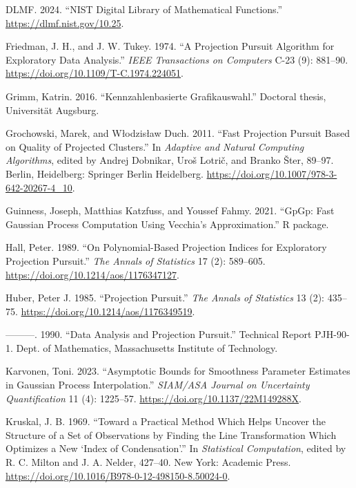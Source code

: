 \documentclass[
  12pt,
]{interact}
\newlength{\cslhangindent}
\newenvironment{CSLReferences}[2] %
 {\begin{list}{}{%
  \setlength{\itemindent}{0pt}
  \setlength{\leftmargin}{0pt}
  \setlength{\parsep}{0pt}
  \ifodd #1
   \setlength{\leftmargin}{\cslhangindent}
   \setlength{\itemindent}{-1\cslhangindent}
  \fi
  \setlength{\itemsep}{#2\baselineskip}}}
 {\end{list}}
\theoremstyle{plain}
\begin{document}
\begin{CSLReferences}{1}{0}
DLMF. 2024. {``{NIST Digital Library of Mathematical Functions}.''}
\url{https://dlmf.nist.gov/10.25}.

Friedman, J. H., and J. W. Tukey. 1974. {``A Projection Pursuit
Algorithm for Exploratory Data Analysis.''} \emph{IEEE Transactions on
Computers} C-23 (9): 881--90.
\url{https://doi.org/10.1109/T-C.1974.224051}.

Grimm, Katrin. 2016. {``Kennzahlenbasierte Grafikauswahl.''} Doctoral
thesis, Universit{ä}t Augsburg.

Grochowski, Marek, and Włodzisław Duch. 2011. {``Fast Projection Pursuit
Based on Quality of Projected Clusters.''} In \emph{Adaptive and Natural
Computing Algorithms}, edited by Andrej Dobnikar, Uroš Lotrič, and
Branko Šter, 89--97. Berlin, Heidelberg: Springer Berlin Heidelberg.
\url{https://doi.org/10.1007/978-3-642-20267-4_10}.

Guinness, Joseph, Matthias Katzfuss, and Youssef Fahmy. 2021. {``{GpGp}:
Fast {G}aussian Process Computation Using {V}ecchia's Approximation.''}
R package.

Hall, Peter. 1989. {``On Polynomial-Based Projection Indices for
Exploratory Projection Pursuit.''} \emph{The Annals of Statistics} 17
(2): 589--605. \url{https://doi.org/10.1214/aos/1176347127}.

Huber, Peter J. 1985. {``Projection Pursuit.''} \emph{The Annals of
Statistics} 13 (2): 435--75.
\url{https://doi.org/10.1214/aos/1176349519}.

---------. 1990. {``Data Analysis and Projection Pursuit.''} Technical
Report PJH-90-1. Dept. of Mathematics, Massachusetts Institute of
Technology.

Karvonen, Toni. 2023. {``Asymptotic Bounds for Smoothness Parameter
Estimates in {G}aussian Process Interpolation.''} \emph{SIAM/ASA Journal
on Uncertainty Quantification} 11 (4): 1225--57.
\url{https://doi.org/10.1137/22M149288X}.

Kruskal, J. B. 1969. {``Toward a Practical Method Which Helps Uncover
the Structure of a Set of Observations by Finding the Line
Transformation Which Optimizes a New {`Index of Condensation'}.''} In
\emph{Statistical Computation}, edited by R. C. Milton and J. A. Nelder,
427--40. New York: Academic Press.
\url{https://doi.org/10.1016/B978-0-12-498150-8.50024-0}.


\end{CSLReferences}
\end{document}
